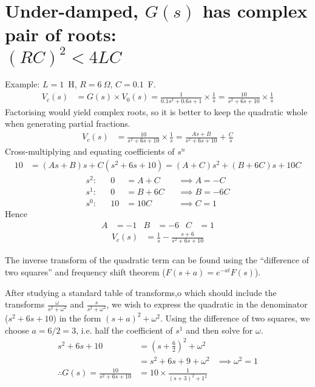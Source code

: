 \documentclass[a4paper,12pt]{article}
\begin{document}
\section*{Under-damped, $G(s)$ has complex pair of roots:\\$(RC)^2<4LC $}
Example: $L=1$~H, $R=6~\Omega$, $C=0.1$~F. %
\begin{align*}
  V_c(s) &= G(s) \times V_0(s)
  = \frac{1}{0.1 s^2 + 0.6 s + 1} \times \frac{1}{s}
  = \frac{10}{s^2 + 6 s + 10} \times \frac{1}{s}
\end{align*}
Factorising would yield complex roots, so it is better to keep the quadratic whole when generating partial fractions.
\begin{align*}
  V_c(s) &= \frac{10}{s^2+6 s + 10} \times \frac{1}{s} = \frac{A s + B}{s^2 + 6 s + 10} + \frac{C}{s}
\end{align*}
Cross-multiplying and equating coefficients of $s^n$
\begin{align*}
  10 &= (As + B)s + C(s^2+6s+10) = (A+C) s^2 + (B+6C) s + 10 C
\end{align*}
\begin{align*}
  s^2: && 0 &= A+C  &&\implies A = -C\\
  s^1: && 0 &= B+6C &&\implies B = -6C\\
  s^0: && 10 &= 10 C && \implies C = 1
\end{align*}
Hence
\begin{align*}
  A &= -1 & B &= -6 & C &= 1
\end{align*}
\begin{align*}
  V_c(s) &= \frac{1}{s} - \frac{s+6}{s^2+6s+10}
\end{align*}


The inverse transform of the quadratic term can be found using
the ``difference of two squares'' and frequency shift theorem
($F(s+a)=e^{-at}F(s)$).

After studying a standard table of transforms,o which should
include the transforms $\frac{\omega}{s^2+\omega^2}$ and
$\frac{s}{s^2+\omega^2}$, we wish to express the quadratic in the
denominator ($s^2+6s+10$) in the form $(s+a)^2+\omega^2$. Using
the difference of two squares, we choose $a=6/2=3$, i.e. half the
coefficient of $s^1$ and then solve for $\omega$.
\begin{align*}
  s^2+6s+10 &= \left(s+\frac{6}{2}\right)^2 + \omega^2 \\
  &= s^2 + 6s + 9 + \omega^2 
  &\implies \omega^2 = 1 \\
  \therefore G(s) = \frac{10}{s^2+6s+10} &= 10 \times \frac{1}{(s+3)^2+1^2}
\end{align*}
\end{document}
